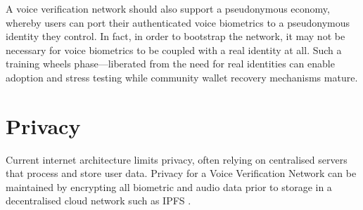 \documentclass[11pt,a4paper]{article}
\begin{document}
A voice verification network should also support a pseudonymous economy, whereby users can port their authenticated voice biometrics to a pseudonymous identity they control.
In fact, in order to bootstrap the network, it may not be necessary for voice biometrics to be coupled with a real identity at all.
Such a \textquotesingle training wheels\textquotesingle{} phase---liberated from the need for real identities can enable adoption and stress testing while community wallet recovery mechanisms mature.

\section{Privacy}
\label{sec:results}
Current internet architecture limits privacy, often relying on centralised servers that process and store user data.
Privacy for a Voice Verification Network can be maintained by encrypting all biometric and audio data prior to storage in a decentralised cloud network such as IPFS \cite{ipfs2023interplanetary}.
\end{document}
